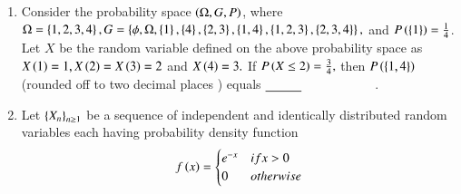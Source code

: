 \documentclass[journal,12pt,onecolumn]{IEEEtran}
\theoremstyle{remark}
\begin{document}
\begin{enumerate}
\item Consider the probability space $\left(\ohm,G,P\right)$, where $\ohm=\left\{1,2,3,4\right\},G=\left\{\phi,\ohm,\left\{1\right\},\left\{4\right\},\left\{2,3\right\},\left\{1,4\right\},\left\{1,2,3\right\},\left\{2,3,4\right\}\right\},$ and $P\left(\left\{1\right\}\right)=\frac{1}{4}$. Let  $X$ be the random variable defined on the above probability space as $X\left(1\right)=1,X\left(2\right)=X\left(3\right)=2$ and $X\left(4\right)=3.$ If $P\left(X\leq 2\right)=\frac{3}{4},$ then $P\left(\left\{1,4\right\}\right)$(rounded off to two decimal places ) equals $\makebox[3cm][l]{\underline{\hspace{1cm}}}$.
\item Let $\left\{X_n\right\}_{n\geq 1}$ be a sequence of independent and identically distributed random variables each having probability density function \[
f\left(x\right)=
\begin{cases}
    e^{-x}&if x>0\\
    0 & otherwise
    

\end{cases}\]
\end{enumerate}
\end{document}
